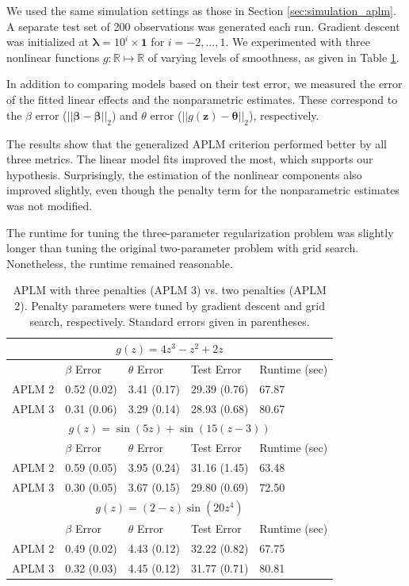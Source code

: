 \documentclass{statsoc}
\begin{document}
We used the same simulation settings as those in Section \ref{sec:simulation_aplm}. A separate test set of 200 observations was generated each run. Gradient descent was initialized at $\boldsymbol{\lambda} = 10^i \times \boldsymbol 1$ for $i=-2, ..., 1$. We experimented with three nonlinear functions $g:\mathbb{R} \mapsto \mathbb{R}$ of varying levels of smoothness, as given in Table \ref{ref:aplm}.

In addition to comparing models based on their test error, we measured the error of the fitted linear effects and the nonparametric estimates. These correspond to the $\beta$ error ($||\boldsymbol \beta - \hat {\boldsymbol \beta}||_2$) and $\theta$ error ($|| g(\boldsymbol z) - \boldsymbol \theta ||_2$), respectively.

The results show that the generalized APLM criterion performed better by all three metrics. The linear model fits improved the most, which supports our hypothesis. Surprisingly, the estimation of the nonlinear components also improved slightly, even though the penalty term for the nonparametric estimates was not modified.

The runtime for tuning the three-parameter regularization problem was slightly longer than tuning the original two-parameter problem with grid search. Nonetheless, the runtime remained reasonable.

\begin{table}
\caption{\label{ref:aplm} APLM with three penalties (APLM 3) vs. two penalties (APLM 2). Penalty parameters were tuned by gradient descent and grid search, respectively. Standard errors given in parentheses.}
\centering
\begin{tabular}{| l | l | l | l | l | }
\hline
\multicolumn{5}{|c|}{$g(z) = 4z^3 - z^2 + 2z$}\\
\hline
 & $\beta$ Error & $\theta$ Error & Test Error & Runtime (sec) \\
\hline
APLM 2 & 0.52 (0.02) & 3.41 (0.17) & 29.39 (0.76) & 67.87 \\
\hline
APLM 3 & 0.31 (0.06) & 3.29 (0.14) & 28.93 (0.68) & 80.67 \\
\hline
\multicolumn{5}{|c|}{$g(z) = \sin(5z) + \sin(15(z - 3))$}\\
\hline
 & $\beta$ Error & $\theta$ Error & Test Error & Runtime (sec) \\
\hline
APLM 2 & 0.59 (0.05) & 3.95 (0.24) & 31.16 (1.45) & 63.48 \\
\hline
APLM 3 & 0.30 (0.05) & 3.67 (0.15) & 29.80 (0.69) & 72.50 \\
\hline
\multicolumn{5}{|c|}{$g(z) = (2-z)\sin(20z^4)$}\\
\hline
 & $\beta$ Error & $\theta$ Error & Test Error & Runtime (sec) \\
\hline
APLM 2 & 0.49 (0.02) & 4.43 (0.12) & 32.22 (0.82) & 67.75 \\
\hline
APLM 3 & 0.32 (0.03) & 4.45 (0.12) & 31.77 (0.71) & 80.81 \\
\hline
\end{tabular}
\end{table}
\end{document}
